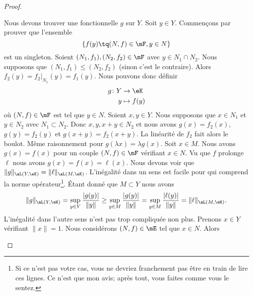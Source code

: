 \begin{proof}
\begin{subproof}
\begin{subproof}
            \spitem[La fonctionnelle]
            Nous devons trouver une fonctionnelle \( g\) sur \( Y\). Soit \( y\in Y\). Commençons par prouver que l'ensemble
            \begin{equation}
                \{ f(y)\tq (N,f)\in \mF, y\in N \}
            \end{equation}
            est un singleton. Soient \( (N_1,f_1), (N_2,f_2)\in\mF\) avec \( y\in N_1\cap N_2\). Nous supposons que \( (N_1,f_1)\leq (N_2,f_2)\) (sinon c'est le contraire). Alors \( f_2(y)=f_2|_{N_1}(y)=f_1(y)\). Nous pouvons donc définir
            \begin{equation}
                \begin{aligned}
                    g\colon Y & \to \eK      \\
                    y         & \mapsto f(y)
                \end{aligned}
            \end{equation}
            où \( (N,f)\in \mF\) est tel que \( y\in N\).
            Soient \( x,y\in Y\). Nous supposons que \( x\in N_1\) et \( y\in N_2\) avec \( N_1\subset N_2\). Donc \( x,y,x+y\in N_2\) et nous avons \( g(x)=f_2(x)\), \( g(y)=f_2(y)\) et \( g(x+y)=f_2(x+y)\). La linéarité de \( f_2\) fait alors le boulot. Même raisonnement pour \( g(\lambda x)=\lambda g(x)\).
            Soit \( x\in M\). Nous avons \( g(x)=f(x)\) pour un couple \( (N,f)\in \mF\) vérifiant \( x\in N\). Vu que \( f\) prolonge \( \ell\) nous avons \( g(x)=f(x)=\ell(x)\).
            \spitem[Norme de \( g\)]
            Nous devons voir que \( \| g \|_{\aL(Y,\eK)}=\| \ell \|_{\aL(M,\eK)}\). L'inégalité dans un sens est facile pour qui comprend la norme opérateur\footnote{Si ce n'est pas votre cas, vous ne devriez franchement pas être en train de lire ces lignes. Ce n'est que mon avis; après tout, vous faites comme vous le sentez.}. Étant donné que \( M\subset Y\) nous avons
            \begin{equation}
                \| g \|_{\aL(Y,\eK)}=\sup_{y\in Y}\frac{ | g(y) | }{ \| y \| }\geq\sup_{y\in M}\frac{ | g(y) | }{ \| y \| }=\sup_{y\in M}\frac{ | \ell(y) | }{ \| y \| }=\| \ell \|_{\aL(M,\eK)}.
            \end{equation}
            L'inégalité dans l'autre sens n'est pas trop compliquée non plus. Prenons \( x\in Y\) vérifiant \( \| x \|=1\). Nous considérons \( (N,f)\in \mE\) tel que \( x\in N\). Alors
            \begin{equation}

\end{equation}
\end{subproof}
\end{subproof}
\end{proof}
